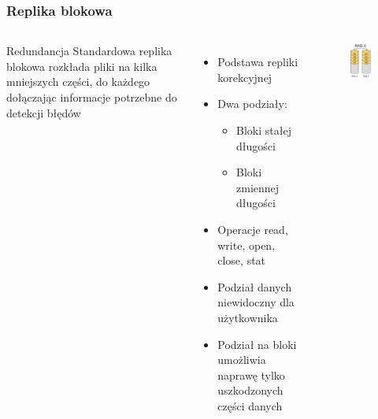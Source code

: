 \documentclass{beamer}
\begin{document}
\begin{frame}
        \frametitle{Replika blokowa}
		\begin{columns}
		\begin{block}{Redundancja}
			Standardowa replika blokowa rozkłada pliki na kilka mniejszych części, do każdego dołączając informacje potrzebne do detekcji błędów
		\end{block}
		\begin{itemize}
			\item Podstawa repliki korekcyjnej 
			\item Dwa podziały:
			\begin{itemize}
				\item Bloki stałej długości
				\item Bloki zmiennej długości
			\end{itemize}
			\item Operacje read, write, open, close, stat
			\item Podział danych niewidoczny dla użytkownika
			\item Podział na bloki umożliwia naprawę tylko uszkodzonych części danych
		\end{itemize}
		\begin{figure}
			\includegraphics[scale=0.5]{raid-0.png}
		\end{figure}
		\end{columns}
\end{frame}
\end{document}
